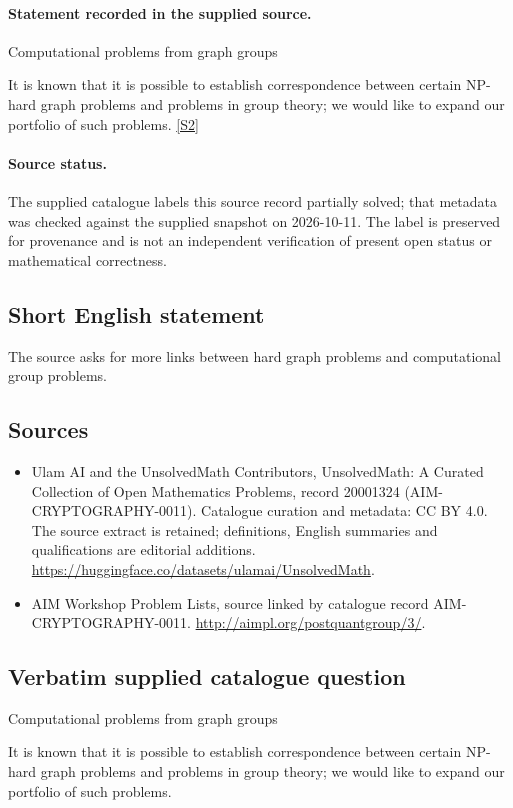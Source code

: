 \documentclass[11pt]{article}
\begin{document}
\paragraph{Statement recorded in the supplied source.}
Computational problems from graph groups

It is known that it is possible to establish correspondence between certain NP-hard graph problems and problems in group theory; we would like to expand our portfolio of such problems. \href{http://aimpl.org/postquantgroup/3/}{[S2]}
\paragraph{Source status.}
The supplied catalogue labels this source record partially solved; that metadata was checked against the supplied snapshot on 2026-10-11. The label is preserved for provenance and is not an independent verification of present open status or mathematical correctness.
\subsection{Short English statement}
The source asks for more links between hard graph problems and computational group problems.
\subsection{Sources}
\begin{itemize}
\item[S1] Ulam AI and the UnsolvedMath Contributors, UnsolvedMath: A Curated Collection of Open Mathematics Problems, record 20001324 (AIM-CRYPTOGRAPHY-0011). Catalogue curation and metadata: CC BY 4.0. The source extract is retained; definitions, English summaries and qualifications are editorial additions.
\url{https://huggingface.co/datasets/ulamai/UnsolvedMath}.
\item[S2] AIM Workshop Problem Lists, source linked by catalogue record AIM-CRYPTOGRAPHY-0011.
\url{http://aimpl.org/postquantgroup/3/}.
\end{itemize}
\subsection{Verbatim supplied catalogue question}
Computational problems from graph groups

It is known that it is possible to establish correspondence between certain NP-hard graph problems and problems in group theory; we would like to expand our portfolio of such problems.
\end{document}

